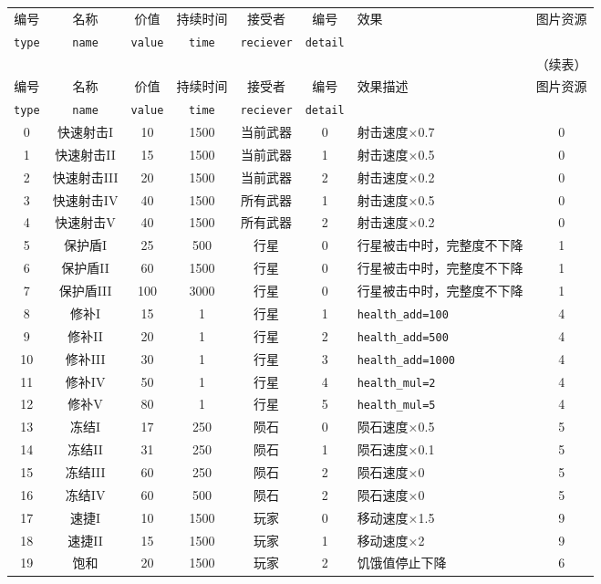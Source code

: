 \documentclass[UTF8,fontset=none,linespread=1.2]{ctexart}
\begin{document}
\begin{center}
\begin{longtable}{|c|c|c|c|c|c|>{\centering\arraybackslash}m{6cm}|c|}
\hline
编号&名称&价值&持续时间&接受者&编号&效果&图片资源\\
\lstinline|type|&\lstinline|name|&\lstinline|value|&\lstinline|time|&\lstinline|reciever|&\lstinline|detail|&&\\\hline
\endfirsthead
\multicolumn{8}{r}{（续表）}\\\hline
编号&名称&价值&持续时间&接受者&编号&效果描述&图片资源\\
\lstinline|type|&\lstinline|name|&\lstinline|value|&\lstinline|time|&\lstinline|reciever|&\lstinline|detail|&&\\\hline
\endhead
0&快速射击I&10&1500&当前武器&0&射击速度×0.7&0\\\hline
1&快速射击II&15&1500&当前武器&1&射击速度×0.5&0\\\hline
2&快速射击III&20&1500&当前武器&2&射击速度×0.2&0\\\hline
3&快速射击IV&40&1500&所有武器&1&射击速度×0.5&0\\\hline
4&快速射击V&40&1500&所有武器&2&射击速度×0.2&0\\\hline
5&保护盾I&25&500&行星&0&行星被击中时，完整度不下降&1\\\hline
6&保护盾II&60&1500&行星&0&行星被击中时，完整度不下降&1\\\hline
7&保护盾III&100&3000&行星&0&行星被击中时，完整度不下降&1\\\hline
8&修补I&15&1&行星&1&\lstinline|health_add=100|&4\\\hline
9&修补II&20&1&行星&2&\lstinline|health_add=500|&4\\\hline
10&修补III&30&1&行星&3&\lstinline|health_add=1000|&4\\\hline
11&修补IV&50&1&行星&4&\lstinline|health_mul=2|&4\\\hline
12&修补V&80&1&行星&5&\lstinline|health_mul=5|&4\\\hline
13&冻结I&17&250&陨石&0&陨石速度×0.5&5\\\hline
14&冻结II&31&250&陨石&1&陨石速度×0.1&5\\\hline
15&冻结III&60&250&陨石&2&陨石速度×0&5\\\hline
16&冻结IV&60&500&陨石&2&陨石速度×0&5\\\hline
17&速捷I&10&1500&玩家&0&移动速度×1.5&9\\\hline
18&速捷II&15&1500&玩家&1&移动速度×2&9\\\hline
19&饱和&20&1500&玩家&2&饥饿值停止下降&6\\\hline

\end{longtable}
\end{center}
\end{document}
